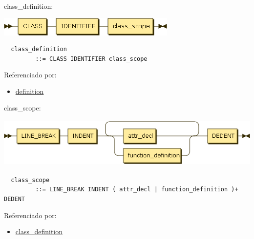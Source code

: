 \begin{minipage}{\textwidth}
  \protect\hypertarget{class_definition}{}{class\_definition:}

  \includegraphics[width=3.47917in,height=0.37500in]{diagram/class_definition.png}

  \begin{verbatim}
  class_definition
         ::= CLASS IDENTIFIER class_scope
  \end{verbatim}

  Referenciado por:

  \begin{itemize}
      \tightlist%
    \item
      \protect\hyperlink{definition}{definition}
  \end{itemize}

\end{minipage}

\begin{minipage}{\textwidth}
  \protect\hypertarget{class_scope}{}{class\_scope:}

  \includegraphics[width=5.72917in,height=1.00000in]{diagram/class_scope.png}

  \begin{verbatim}
  class_scope
         ::= LINE_BREAK INDENT ( attr_decl | function_definition )+ DEDENT
  \end{verbatim}

  Referenciado por:

  \begin{itemize}
      \tightlist%
    \item
      \protect\hyperlink{class_definition}{class\_definition}
  \end{itemize}

\end{minipage}

